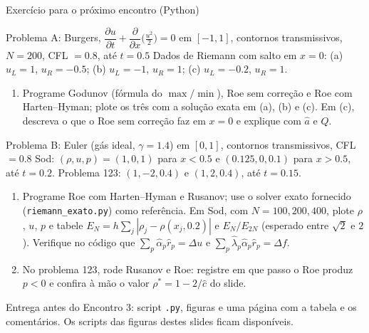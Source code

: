\documentclass[aspectratio=169,10pt]{beamer}
\newcommand{\pd}[2]{\dfrac{\partial #1}{\partial #2}}
\newcommand{\lh}{\hat\lambda}
\newcommand{\ah}{\hat\alpha}
\newcommand{\rh}{\hat r}
\begin{document}
\begin{frame}{Exercício para o próximo encontro (Python)}
\begin{exampleblock}{Problema A: Burgers, $\pd ut+\pd{}{x}\big(\tfrac{u^2}{2}\big)=0$ em $[-1,1]$, contornos transmissivos, $N=200$, CFL $=0.8$, até $t=0.5$}
Dados de Riemann com salto em $x=0$: (a) $u_L=1$, $u_R=-0.5$; (b) $u_L=-1$, $u_R=1$; (c) $u_L=-0.2$, $u_R=1$.
\end{exampleblock}
\vspace{-0.15cm}
\begin{enumerate}\footnotesize
\item Programe Godunov (fórmula do $\max/\min$), Roe sem correção e Roe com Harten--Hyman; plote os três com a solução exata em (a), (b) e (c). Em (c), descreva o que o Roe sem correção faz em $x=0$ e explique com $\hat a$ e $Q$.
\end{enumerate}
\vspace{-0.15cm}
\begin{exampleblock}{Problema B: Euler (gás ideal, $\gamma=1.4$) em $[0,1]$, contornos transmissivos, CFL $=0.8$}
Sod: $(\rho,u,p)=(1,0,1)$ para $x<0.5$ e $(0.125,0,0.1)$ para $x>0.5$, até $t=0.2$. Problema 123: $(1,-2,0.4)$ e $(1,2,0.4)$, até $t=0.15$.
\end{exampleblock}
\vspace{-0.15cm}
\begin{enumerate}\footnotesize\setcounter{enumi}{1}
\item Programe Roe com Harten--Hyman e Rusanov; use o solver exato fornecido (\texttt{riemann\_exato.py}) como referência. Em Sod, com $N=100,200,400$, plote $\rho$, $u$, $p$ e tabele $E_N=h\sum_j|\rho_j-\rho(x_j,0.2)|$ e $E_N/E_{2N}$ (esperado entre $\sqrt2$ e $2$). Verifique no código que $\sum_p\ah_p\rh_p=\Delta u$ e $\sum_p\lh_p\ah_p\rh_p=\Delta f$.
\item No problema 123, rode Rusanov e Roe: registre em que passo o Roe produz $p<0$ e confira à mão o valor $\rho^*=1-2/\hat c$ do slide.
\end{enumerate}
{\footnotesize Entrega antes do Encontro 3: script \texttt{.py}, figuras e uma página com a tabela e os comentários. Os scripts das figuras destes slides ficam disponíveis.}
\end{frame}
\end{document}
